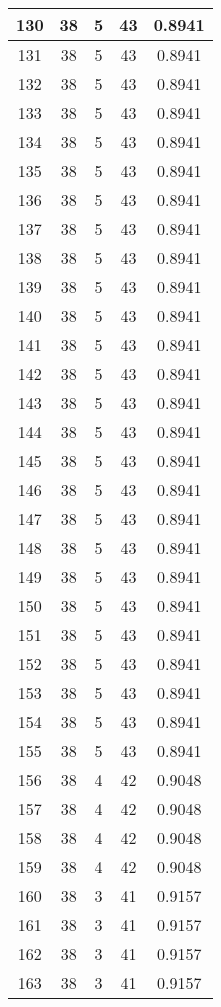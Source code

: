 \documentclass[letterpaper, 12pt]{article}
\begin{document}
\begin{longtable}{|c|c|c|c|c|}
\hline
130 & 38 & 5 & 43 & 0.8941 \\
\hline
131 & 38 & 5 & 43 & 0.8941 \\
\hline
132 & 38 & 5 & 43 & 0.8941 \\
\hline
133 & 38 & 5 & 43 & 0.8941 \\
\hline
134 & 38 & 5 & 43 & 0.8941 \\
\hline
135 & 38 & 5 & 43 & 0.8941 \\
\hline
136 & 38 & 5 & 43 & 0.8941 \\
\hline
137 & 38 & 5 & 43 & 0.8941 \\
\hline
138 & 38 & 5 & 43 & 0.8941 \\
\hline
139 & 38 & 5 & 43 & 0.8941 \\
\hline
140 & 38 & 5 & 43 & 0.8941 \\
\hline
141 & 38 & 5 & 43 & 0.8941 \\
\hline
142 & 38 & 5 & 43 & 0.8941 \\
\hline
143 & 38 & 5 & 43 & 0.8941 \\
\hline
144 & 38 & 5 & 43 & 0.8941 \\
\hline
145 & 38 & 5 & 43 & 0.8941 \\
\hline
146 & 38 & 5 & 43 & 0.8941 \\
\hline
147 & 38 & 5 & 43 & 0.8941 \\
\hline
148 & 38 & 5 & 43 & 0.8941 \\
\hline
149 & 38 & 5 & 43 & 0.8941 \\
\hline
150 & 38 & 5 & 43 & 0.8941 \\
\hline
151 & 38 & 5 & 43 & 0.8941 \\
\hline
152 & 38 & 5 & 43 & 0.8941 \\
\hline
153 & 38 & 5 & 43 & 0.8941 \\
\hline
154 & 38 & 5 & 43 & 0.8941 \\
\hline
155 & 38 & 5 & 43 & 0.8941 \\
\hline
156 & 38 & 4 & 42 & 0.9048 \\
\hline
157 & 38 & 4 & 42 & 0.9048 \\
\hline
158 & 38 & 4 & 42 & 0.9048 \\
\hline
159 & 38 & 4 & 42 & 0.9048 \\
\hline
160 & 38 & 3 & 41 & 0.9157 \\
\hline
161 & 38 & 3 & 41 & 0.9157 \\
\hline
162 & 38 & 3 & 41 & 0.9157 \\
\hline
163 & 38 & 3 & 41 & 0.9157 \\

\end{longtable}
\end{document}

